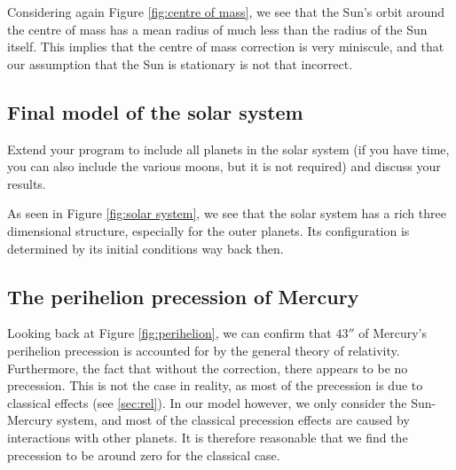 Considering again Figure \ref{fig:centre of mass}, we see that the Sun's orbit around
the centre of mass has a mean radius of much less than the radius of the Sun itself.
This implies that the centre of mass correction is very miniscule, and that our assumption
that the Sun is stationary is not that incorrect.

\subsection{Final model of the solar system}
Extend your program to include all planets in the solar system (if you
have time, you can also include the various moons, but it is not required) and
discuss your results.

As seen in Figure \ref{fig:solar system}, we see that the solar system has a rich
three dimensional structure, especially for the outer planets. Its configuration is determined by its
initial conditions way back then.


\subsection{The perihelion precession of Mercury}
Looking back at Figure \ref{fig:perihelion}, we can confirm that $43''$ of Mercury's perihelion
precession is accounted for by the general theory of relativity. Furthermore, the fact that without the correction, there
appears to be no precession. This is not the case in reality, as most of the precession is due to classical effects (see \ref{sec:rel}). In our model however, we only consider the Sun-Mercury system, and most of the classical precession effects are caused by interactions with other planets. It is therefore reasonable that we find the precession to be around zero for the classical case.
